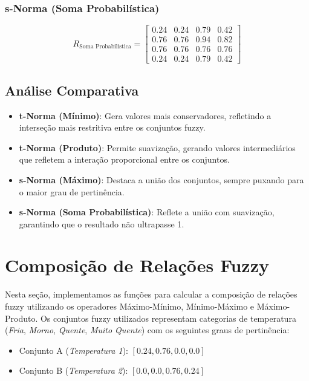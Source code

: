 \documentclass[a4paper,12pt]{article}
\begin{document}
\subsubsection{s-Norma (Soma Probabilística)}
\[
R_{\text{Soma Probabilística}} =
\begin{bmatrix}
0.24 & 0.24 & 0.79 & 0.42 \\
0.76 & 0.76 & 0.94 & 0.82 \\
0.76 & 0.76 & 0.76 & 0.76 \\
0.24 & 0.24 & 0.79 & 0.42
\end{bmatrix}
\]

\subsection{Análise Comparativa}

\begin{itemize}
    \item \textbf{t-Norma (Mínimo)}: Gera valores mais conservadores, refletindo a interseção mais restritiva entre os conjuntos fuzzy.
    \item \textbf{t-Norma (Produto)}: Permite suavização, gerando valores intermediários que refletem a interação proporcional entre os conjuntos.
    \item \textbf{s-Norma (Máximo)}: Destaca a união dos conjuntos, sempre puxando para o maior grau de pertinência.
    \item \textbf{s-Norma (Soma Probabilística)}: Reflete a união com suavização, garantindo que o resultado não ultrapasse 1.
\end{itemize}


\section{Composição de Relações Fuzzy}

Nesta seção, implementamos as funções para calcular a composição de relações fuzzy utilizando os operadores Máximo-Mínimo, Mínimo-Máximo e Máximo-Produto. Os conjuntos fuzzy utilizados representam categorias de temperatura (\textit{Fria}, \textit{Morno}, \textit{Quente}, \textit{Muito Quente}) com os seguintes graus de pertinência:

\begin{itemize}
    \item Conjunto A (\textit{Temperatura 1}): $[0.24, 0.76, 0.0, 0.0]$
    \item Conjunto B (\textit{Temperatura 2}): $[0.0, 0.0, 0.76, 0.24]$
\end{itemize}
\end{document}
